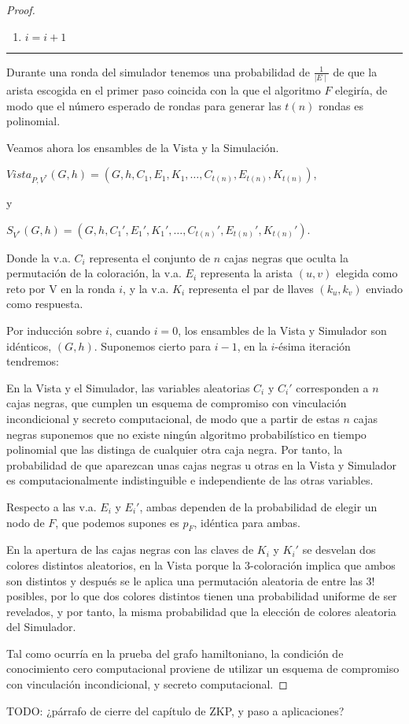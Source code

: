 \begin{proof}
\begin{enumerate}
		\item $i = i+1$
		
	\end{enumerate}
	
	\rule{\textwidth}{1pt}
	
	\hfill
	
	Durante una ronda del simulador tenemos una probabilidad de $\frac{1}{\mid E \mid}$ de que la arista escogida en el primer paso coincida con la que el algoritmo $F$ elegiría, de modo que el número esperado de rondas para generar las $t(n)$ rondas es polinomial.
	
	
	Veamos ahora los ensambles de la Vista y la Simulación.
	\begin{center}
		$Vista_{P,V^*}(G,h) = (G,h,C_1,E_1,K_1,\dots , C_{t(n)}, E_{t(n)}, K_{t(n)})$,
	\end{center}
	y 
	\begin{center}
		$S_{V^*}(G,h) = (G,h,C_1',E_1',K_1',\dots , C_{t(n)}', E_{t(n)}', K_{t(n)}')$.
	\end{center}
	
	Donde la v.a. $C_i$ representa el conjunto de $n$ cajas negras que oculta la permutación de la coloración, la v.a. $E_i$ representa la arista $(u,v)$ elegida como reto por V en la ronda $i$, y la v.a. $K_i$ representa el par de llaves $(k_u,k_v)$ enviado como respuesta.
	
	Por inducción sobre $i$, cuando $i=0$, los ensambles de la Vista y Simulador son idénticos, $(G,h)$. Suponemos cierto para $i-1$, en la $i$-ésima iteración tendremos:
	
	
	En la Vista y el Simulador, las variables aleatorias $C_i$ y $C_i'$ corresponden a $n$ cajas negras, que cumplen un esquema de compromiso con vinculación incondicional y secreto computacional, de modo que a partir de estas $n$ cajas negras suponemos que no existe ningún algoritmo probabilístico en tiempo polinomial que las distinga de cualquier otra caja negra. Por tanto, la probabilidad de que aparezcan unas cajas negras u otras en la Vista y Simulador es computacionalmente indistinguible e independiente de las otras variables.
	
	Respecto a las v.a. $E_i$ y $E_i'$, ambas dependen de la probabilidad de elegir un nodo de $F$, que podemos supones es $p_F$, idéntica para ambas.
	
	En la apertura de las cajas negras con las claves de $K_i$ y $K_i'$ se desvelan dos colores distintos aleatorios, en la Vista porque la 3-coloración implica que ambos son distintos y después se le aplica una permutación aleatoria de entre las $3!$ posibles, por lo que dos colores distintos tienen una probabilidad uniforme de ser revelados, y por tanto, la misma probabilidad que la elección de colores aleatoria del Simulador.
	
	Tal como ocurría en la prueba del grafo hamiltoniano, la condición de conocimiento cero computacional proviene de utilizar un esquema de compromiso con vinculación incondicional, y secreto computacional.
\end{proof}



\hfil


\hfil


\hfil

TODO: ¿párrafo de cierre del capítulo de ZKP, y paso a aplicaciones?
